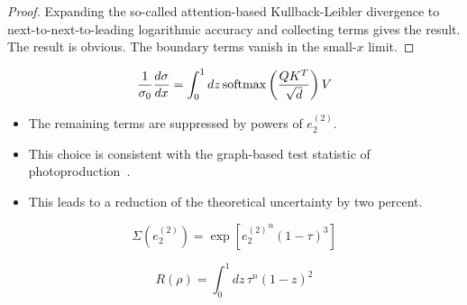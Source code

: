 \begin{proof}
Expanding the so-called attention-based Kullback-Leibler divergence to
next-to-next-to-leading logarithmic accuracy and collecting terms gives
the result. The result is obvious. The boundary terms vanish in the
small-$x$ limit.
\end{proof}

\begin{equation}
  \frac{1}{\sigma_0} \frac{d\sigma}{dx} = \int_0^1 dz \, \mathrm{softmax}\left(\frac{Q K^T}{\sqrt{d}}\right) V
  \label{eq:3}
\end{equation}

\begin{itemize}
  \item The remaining terms are suppressed by powers of $e_2^{(2)}$.
  \item This choice is consistent with the graph-based test statistic of photoproduction~\cite{TPC:1457-The-Resummation-of-the-Thrust-Distribution-September-30-2026}.
  \item This leads to a reduction of the theoretical uncertainty by two percent.
\end{itemize}

\begin{equation}
  \Sigma(e_2^{(2)}) = \exp\left[{e_2^{(2)}}^{n} (1 - \tau)^{3}\right]
  \label{eq:4}
\end{equation}

\begin{equation}
  R(\rho) = \int_0^1 dz \, {\tau}^{n} (1 - z)^{2}
  \label{eq:5}
\end{equation}

